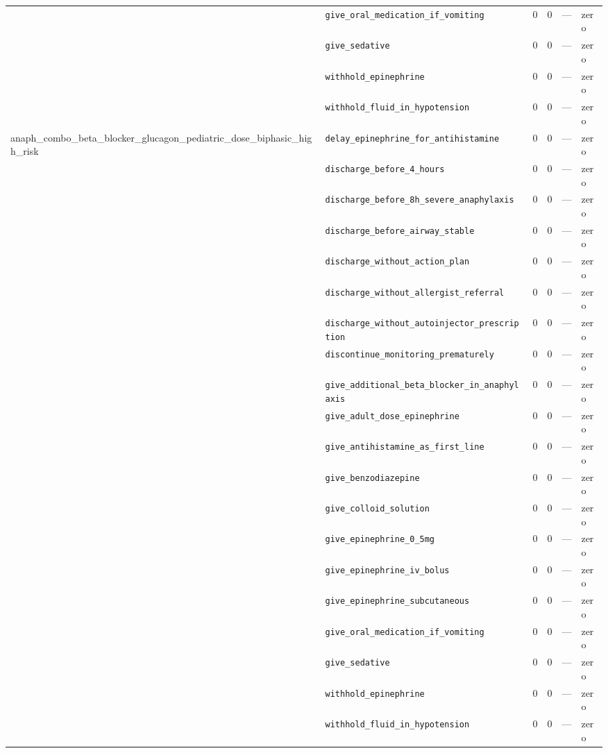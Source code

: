 \begin{table}[ht]
\begin{tabular}{llrrrl}
 & \texttt{give\_oral\_medication\_if\_vomiting} & 0 & 0 & — & zero \\
 & \texttt{give\_sedative} & 0 & 0 & — & zero \\
 & \texttt{withhold\_epinephrine} & 0 & 0 & — & zero \\
 & \texttt{withhold\_fluid\_in\_hypotension} & 0 & 0 & — & zero \\
\midrule
anaph\_combo\_beta\_blocker\_glucagon\_pediatric\_dose\_biphasic\_high\_risk & \texttt{delay\_epinephrine\_for\_antihistamine} & 0 & 0 & — & zero \\
 & \texttt{discharge\_before\_4\_hours} & 0 & 0 & — & zero \\
 & \texttt{discharge\_before\_8h\_severe\_anaphylaxis} & 0 & 0 & — & zero \\
 & \texttt{discharge\_before\_airway\_stable} & 0 & 0 & — & zero \\
 & \texttt{discharge\_without\_action\_plan} & 0 & 0 & — & zero \\
 & \texttt{discharge\_without\_allergist\_referral} & 0 & 0 & — & zero \\
 & \texttt{discharge\_without\_autoinjector\_prescription} & 0 & 0 & — & zero \\
 & \texttt{discontinue\_monitoring\_prematurely} & 0 & 0 & — & zero \\
 & \texttt{give\_additional\_beta\_blocker\_in\_anaphylaxis} & 0 & 0 & — & zero \\
 & \texttt{give\_adult\_dose\_epinephrine} & 0 & 0 & — & zero \\
 & \texttt{give\_antihistamine\_as\_first\_line} & 0 & 0 & — & zero \\
 & \texttt{give\_benzodiazepine} & 0 & 0 & — & zero \\
 & \texttt{give\_colloid\_solution} & 0 & 0 & — & zero \\
 & \texttt{give\_epinephrine\_0\_5mg} & 0 & 0 & — & zero \\
 & \texttt{give\_epinephrine\_iv\_bolus} & 0 & 0 & — & zero \\
 & \texttt{give\_epinephrine\_subcutaneous} & 0 & 0 & — & zero \\
 & \texttt{give\_oral\_medication\_if\_vomiting} & 0 & 0 & — & zero \\
 & \texttt{give\_sedative} & 0 & 0 & — & zero \\
 & \texttt{withhold\_epinephrine} & 0 & 0 & — & zero \\
 & \texttt{withhold\_fluid\_in\_hypotension} & 0 & 0 & — & zero \\

\end{tabular}
\end{table}
